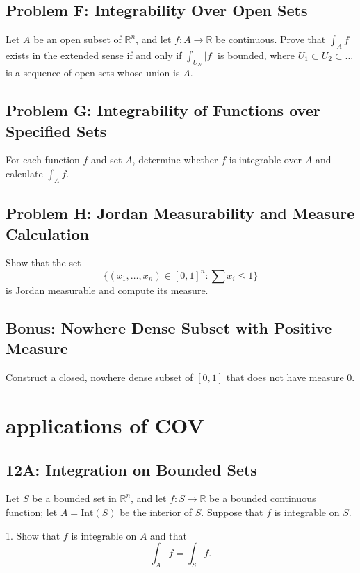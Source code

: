 \documentclass[lang=cn,11pt]{template}
\begin{document}
\section*{Problem F: Integrability Over Open Sets}
Let \( A \) be an open subset of \( \mathbb{R}^n \), and let \( f : A \rightarrow \mathbb{R} \) be continuous. Prove that \( \int_A f \) exists in the extended sense if and only if \( \int_{U_N} |f| \) is bounded, where \( U_1 \subset U_2 \subset \dots \) is a sequence of open sets whose union is \( A \).

\section*{Problem G: Integrability of Functions over Specified Sets}
For each function \( f \) and set \( A \), determine whether \( f \) is integrable over \( A \) and calculate \( \int_A f \).

\section*{Problem H: Jordan Measurability and Measure Calculation}
Show that the set 
\[
\{ (x_1, \dots, x_n) \in [0, 1]^n : \sum x_i \leq 1 \}
\]
is Jordan measurable and compute its measure.

\section*{Bonus: Nowhere Dense Subset with Positive Measure}
Construct a closed, nowhere dense subset of \([0,1]\) that does not have measure 0.








\chapter{applications of COV}

\section*{12A: Integration on Bounded Sets}
Let \( S \) be a bounded set in \( \mathbb{R}^n \), and let \( f : S \rightarrow \mathbb{R} \) be a bounded continuous function; let \( A = \text{Int}(S) \) be the interior of \( S \). Suppose that \( f \) is integrable on \( S \).

1. Show that \( f \) is integrable on \( A \) and that
   \[
   \int_A f = \int_S f.
   \]
\end{document}
